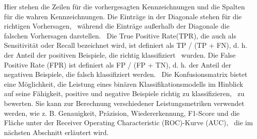 Hier stehen die Zeilen für die vorhergesagten Kennzeichnungen und die Spalten für die wahren Kennzeichnungen. Die Einträge in der Diagonale stehen für die richtigen Vorhersagen, \ 
während die Einträge außerhalb der Diagonale die falschen Vorhersagen darstellen. \
Die \glqq True Positive Rate\grqq{}(TPR), die auch als Sensitivität oder Recall bezeichnet wird, ist definiert als TP / (TP + FN), d. h. der Anteil der positiven Beispiele, die richtig klassifiziert \ 
wurden. Die \glqq False Positive Rate\grqq{} (FPR) ist definiert als FP / (FP + TN), d. h. der Anteil der negativen Beispiele, die falsch klassifiziert werden. \
Die Konfusionsmatrix bietet eine Möglichkeit, die Leistung eines binären Klassifikationsmodells im Hinblick auf seine Fähigkeit, positive und negative Beispiele richtig zu klassifizieren, \ 
zu bewerten. Sie kann zur Berechnung verschiedener Leistungsmetriken verwendet werden, wie z. B. Genauigkeit, Präzision, Wiedererkennung, F1-Score und die Fläche unter der \glqq Receiver Operating Characteristic\grqq{} (ROC)-Kurve (AUC), \ 
die im nächsten Abschnitt erläutert wird.
